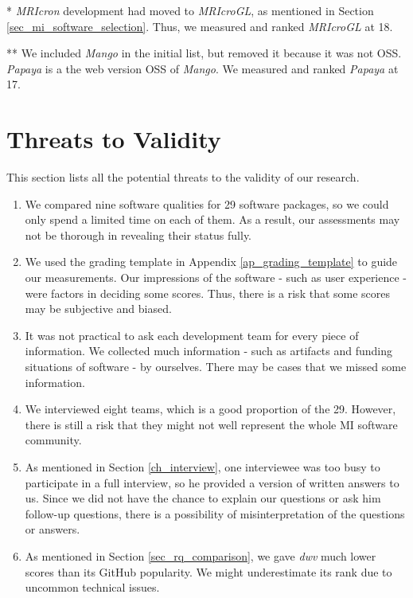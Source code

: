 * \textit{MRIcron} development had moved to \textit{MRIcroGL}, as mentioned in Section \ref{sec_mi_software_selection}. Thus, we measured and ranked \textit{MRIcroGL} at 18.

** We included \textit{Mango} in the initial list, but removed it because it was not OSS. \textit{Papaya} is a the web version OSS of \textit{Mango}. We measured and ranked \textit{Papaya} at 17.

\section{Threats to Validity}
\label{sec_threats_to_validity}
This section lists all the potential threats to the validity of our research.



\begin{enumerate}
\item We compared nine software qualities for 29 software packages, so we could only spend a limited time on each of them. As a result, our assessments may not be thorough in revealing their status fully.
\item We used the grading template in Appendix \ref{ap_grading_template} to guide our measurements. Our impressions of the software - such as user experience - were factors in deciding some scores. Thus, there is a risk that some scores may be subjective and biased.
\item It was not practical to ask each development team for every piece of information. We collected much information - such as artifacts and funding situations of software - by ourselves. There may be cases that we missed some information.
\item We interviewed eight teams, which is a good proportion of the 29. However, there is still a risk that they might not well represent the whole MI software community.
\item As mentioned in Section \ref{ch_interview}, one interviewee was too busy to participate in a full interview, so he provided a version of written answers to us. Since we did not have the chance to explain our questions or ask him follow-up questions, there is a possibility of misinterpretation of the questions or answers.
\item As mentioned in Section \ref{sec_rq_comparison}, we gave \textit{dwv} much lower scores than its GitHub popularity. We might underestimate its rank due to uncommon technical issues.
\end{enumerate}
